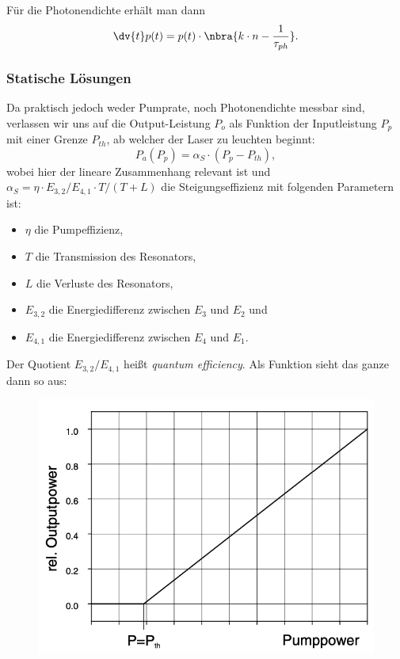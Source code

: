 \documentclass{subfiles}
\begin{document}
\begin{Antwort}
        Für die Photonendichte erhält man dann 
        \[
            \dv{t}p(t) = p(t)\cdot\nbra{k\cdot n - \frac{1}{\tau_{ph}}}.
        \]

        \subsubsection*{Statische Lösungen}
        Da praktisch jedoch weder Pumprate, noch Photonendichte messbar sind, verlassen wir uns auf die Output-Leistung $P_o$ als Funktion der Inputleistung $P_p$ mit einer Grenze $P_{th}$, ab welcher der Laser zu leuchten beginnt:
        \[
            P_a(P_p) = \alpha_S\cdot (P_p - P_{th}), \tag{P}
        \]
        wobei hier der lineare Zusammenhang relevant ist und $\alpha_S = \eta\cdot E_{3,2}/E_{4,1} \cdot T/(T + L)$ die Steigungseffizienz mit folgenden Parametern ist:
        \begin{itemize}
            \item $\eta$ die Pumpeffizienz,
            \item $T$ die Transmission des Resonators,
            \item $L$ die Verluste des Resonators,
            \item $E_{3,2}$ die Energiedifferenz zwischen $E_3$ und $E_2$ und
            \item $E_{4,1}$ die Energiedifferenz zwischen $E_4$ und $E_1$.
        \end{itemize}
        Der Quotient $E_{3,2}/E_{4,1}$ heißt \emph{quantum efficiency}.
        Als Funktion sieht das ganze dann so aus:
        \begin{figure}
            \centering
            \includegraphics[options]{Bilddateien/Pumpleistung.png}

\end{figure}
\end{Antwort}
\end{document}
